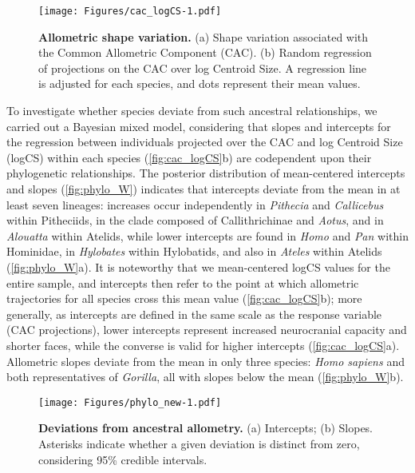 \documentclass[12pt,twoside]{report}
\begin{document}
\begin{figure}[htbp]
\centering
\texttt{[image: Figures/cac\_logCS-1.pdf]}
\caption{\textbf{Allometric shape variation.} (a) Shape variation
associated with the Common Allometric Component (CAC). (b) Random
regression of projections on the CAC over log Centroid Size. A
regression line is adjusted for each species, and dots represent their
mean values. \label{fig:cac_logCS}}
\end{figure}

To investigate whether species deviate from such ancestral
relationships, we carried out a Bayesian mixed model, considering that
slopes and intercepts for the regression between individuals projected
over the CAC and log Centroid Size (logCS) within each species
(\autoref{fig:cac_logCS}b) are codependent upon their phylogenetic
relationships. The posterior distribution of mean-centered intercepts
and slopes (\autoref{fig:phylo_W}) indicates that intercepts deviate
from the mean in at least seven lineages: increases occur independently
in \emph{Pithecia} and \emph{Callicebus} within Pitheciids, in the clade
composed of Callithrichinae and \emph{Aotus}, and in \emph{Alouatta}
within Atelids, while lower intercepts are found in \emph{Homo} and
\emph{Pan} within Hominidae, in \emph{Hylobates} within Hylobatids, and
also in \emph{Ateles} within Atelids (\autoref{fig:phylo_W}a). It is
noteworthy that we mean-centered logCS values for the entire sample, and
intercepts then refer to the point at which allometric trajectories for
all species cross this mean value (\autoref{fig:cac_logCS}b); more
generally, as intercepts are defined in the same scale as the response
variable (CAC projections), lower intercepts represent increased
neurocranial capacity and shorter faces, while the converse is valid for
higher intercepts (\autoref{fig:cac_logCS}a). Allometric slopes deviate
from the mean in only three species: \emph{Homo sapiens} and both
representatives of \emph{Gorilla}, all with slopes below the mean
(\autoref{fig:phylo_W}b).

\begin{figure}[htbp]
\centering
\texttt{[image: Figures/phylo\_new-1.pdf]}
\caption{\textbf{Deviations from ancestral allometry.} (a) Intercepts;
(b) Slopes. Asterisks indicate whether a given deviation is distinct
from zero, considering 95\% credible intervals. \label{fig:phylo_W}}
\end{figure}
\end{document}
